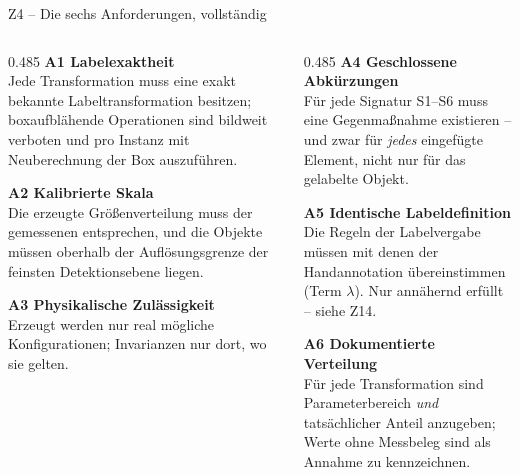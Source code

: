 \documentclass[14pt,aspectratio=169]{beamer}
\begin{document}
\begin{frame}{Z4 -- Die sechs Anforderungen, vollständig}
\zusatzdicht
\begin{columns}[T,onlytextwidth]
\begin{column}{0.485\textwidth}
\textbf{A1 Labelexaktheit}\\
Jede Transformation muss eine exakt bekannte Labeltransformation besitzen;
boxaufblähende Operationen sind bildweit verboten und pro Instanz mit
Neuberechnung der Box auszuführen.
\smallskip

\textbf{A2 Kalibrierte Skala}\\
Die erzeugte Größenverteilung muss der gemessenen entsprechen, und die
Objekte müssen oberhalb der Auflösungsgrenze der feinsten Detektionsebene
liegen.
\smallskip

\textbf{A3 Physikalische Zulässigkeit}\\
Erzeugt werden nur real mögliche Konfigurationen; Invarianzen nur dort, wo
sie gelten.
\end{column}
\begin{column}{0.485\textwidth}
\textbf{A4 Geschlossene Abkürzungen}\\
Für jede Signatur S1--S6 muss eine Gegenmaßnahme existieren -- und zwar für
\emph{jedes} eingefügte Element, nicht nur für das gelabelte Objekt.
\smallskip

\textbf{A5 Identische Labeldefinition}\\
Die Regeln der Labelvergabe müssen mit denen der Handannotation
übereinstimmen (Term $\lambda$).
\textcolor{warn}{Nur annähernd erfüllt -- siehe Z14.}
\smallskip

\textbf{A6 Dokumentierte Verteilung}\\
Für jede Transformation sind Parameterbereich \emph{und} tatsächlicher Anteil
anzugeben; Werte ohne Messbeleg sind als Annahme zu kennzeichnen.
\end{column}
\end{columns}
\end{frame}
\end{document}
